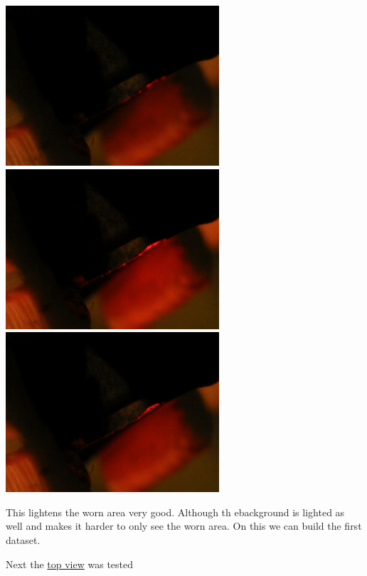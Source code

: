 \documentclass{scrartcl}
\begin{document}
\includegraphics[width=3.125000in, keepaspectratio=true]{./1_camera_position_side/p3_l8.png}\includegraphics[width=3.125000in, keepaspectratio=true]{./1_camera_position_side/p3_l9.png}\includegraphics[width=3.125000in, keepaspectratio=true]{./1_camera_position_side/p3_l10.png}



This lightens the worn area very good. Although th ebackground is lighted as well and makes it harder to only see the worn area. On this we can build the first dataset. 

Next the \href{./2_camera_position_top.tex}{top view} was tested 
\end{document}

